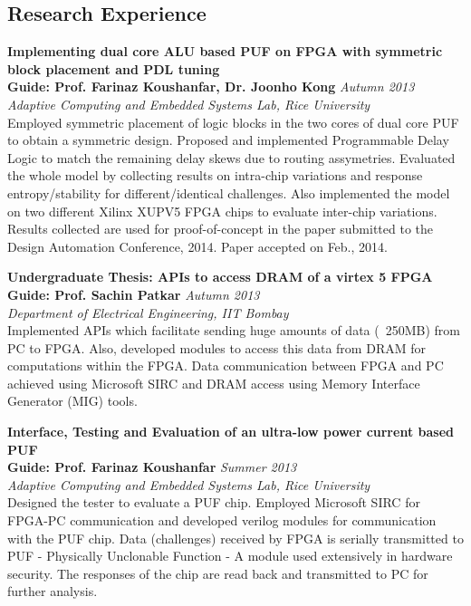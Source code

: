 \documentclass[margin,line]{resume}
\begin{document}
\begin{resume}
\section{\mysidestyle Research Experience}
	
    {\bf Implementing dual core ALU based PUF on FPGA with symmetric block placement and PDL tuning} \\
    {\bf Guide: Prof. Farinaz Koushanfar, Dr. Joonho Kong} \hfill \textit{Autumn 2013} \\
    {\it Adaptive Computing and Embedded Systems Lab, Rice University} \\
	Employed symmetric placement of logic blocks in the two cores of dual core PUF to obtain a symmetric design. Proposed and implemented Programmable Delay Logic to match the remaining delay skews due to routing assymetries. Evaluated the whole model by collecting results on intra-chip variations and response entropy/stability for different/identical challenges. Also implemented the model on two different Xilinx XUPV5 FPGA chips to evaluate inter-chip variations. Results collected are used for proof-of-concept in the paper submitted to the Design Automation Conference, 2014. Paper accepted on Feb., 2014.
	
	{\bf  Undergraduate Thesis: APIs to access DRAM of a virtex 5 FPGA} \\
	{\bf Guide: Prof. Sachin Patkar} 	\hfill \textit{Autumn 2013} \\
	{\it Department of Electrical Engineering, IIT Bombay}\\
	Implemented APIs which facilitate sending huge amounts of data (~250MB) from PC to FPGA. Also, developed  modules to access this data from DRAM for computations within the FPGA. Data communication between FPGA and PC achieved using Microsoft SIRC and DRAM access using Memory Interface Generator (MIG) tools.
	
    {\bf Interface, Testing and Evaluation of an ultra-low power current based PUF} \\
    {\bf Guide: Prof. Farinaz Koushanfar} \hfill \textit{Summer 2013} \\
    {\it Adaptive Computing and Embedded Systems Lab, Rice University} \\
	Designed the tester to evaluate a PUF chip. Employed Microsoft SIRC for FPGA-PC communication and developed verilog modules for communication with the PUF chip. Data (challenges) received by FPGA is serially transmitted to PUF - Physically Unclonable Function - A module used extensively in hardware security. The responses of the chip are read back and transmitted to PC for further analysis.
	

\end{resume}
\end{document}
